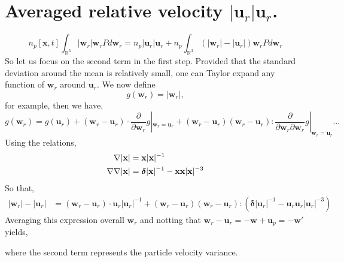 \section{Averaged relative velocity $|\textbf{u}_r|\textbf{u}_r$. }
\label{ap:varience}
\begin{equation}
    n_p[\textbf{x},t] \int_{\mathbb{R}^3} 
    |\textbf{w}_r| \textbf{w}_r
    P
    d\textbf{w}_r
    =
    n_p  
    |\textbf{u}_r|\textbf{u}_r
    + n_p  \int_{\mathbb{R}^3} 
     (|\textbf{w}_r | - |\textbf{u}_r|)\textbf{w}_r
    P
    d\textbf{w}_r
\end{equation}
So let us focus on the second term in the first step. 
Provided that the standard deviation around the mean is relatively small, one can Taylor expand any function of $\textbf{w}_r$ around $\textbf{u}_r$. 
We now define
\begin{equation}
    g(\textbf{w}_r)  = |\textbf{w}_r|,
\end{equation}
for example, then we have, 
\begin{equation}
    g(\textbf{w}_r) =   
    g(\textbf{u}_r)
    + (\textbf{w}_r - \textbf{u}_r)\cdot \frac{\partial}{\partial \textbf{w}_r} g|_{\textbf{w}_r = \textbf{u}_r}
    + (\textbf{w}_r - \textbf{u}_r)(\textbf{w}_r - \textbf{u}_r) : \frac{\partial}{\partial \textbf{w}_r\partial \textbf{w}_r}  g|_{\textbf{w}_r = \textbf{u}_r}\ldots
\end{equation}
Using the relations, 
\begin{align}
    \mathbf{\nabla}|\textbf{x}| &=\textbf{x} |\textbf{x}|^{-1}\\
    \mathbf{\nabla}\mathbf{\nabla}|\textbf{x}| &= \bm\delta |\textbf{x}|^{-1} - \textbf{xx} |\textbf{x}|^{-3}\\
\end{align}
So that, 
\begin{align*}
    |\textbf{w}_r| 
    - |\textbf{u}_r|
    &=
    (\textbf{w}_r - \textbf{u}_r)\cdot \textbf{u}_r |\textbf{u}_r|^{-1}
    +(\textbf{w}_r - \textbf{u}_r)(\textbf{w}_r - \textbf{u}_r):
    (\bm\delta |\textbf{u}_r|^{-1} - \textbf{u}_r\textbf{u}_r|\textbf{u}_r|^{-3})
\end{align*}
Averaging this expression overall $\textbf{w}_r$ and notting that $\textbf{w}_r - \textbf{u}_r = -\textbf{w} + \textbf{u}_p = -\textbf{w}'$ yields,

where the second term represents the particle velocity variance.

